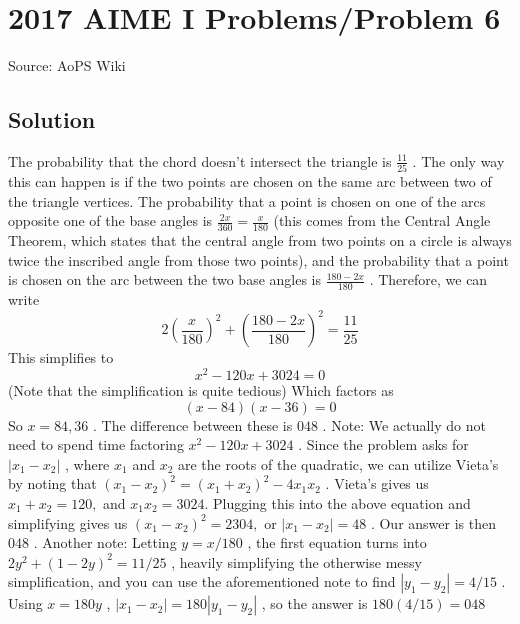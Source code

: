 \documentclass[12pt]{article}
\begin{document}
\section*{{2017 AIME I Problems/Problem 6}}
Source: AoPS Wiki

\subsection*{Solution}
The probability that the chord doesn't intersect the triangle is $\frac{11}{25}$ . The only way this can happen is if the two points are chosen on the same arc between two of the triangle vertices. The probability that a point is chosen on one of the arcs opposite one of the base angles is $\frac{2x}{360}=\frac{x}{180}$ (this comes from the Central Angle Theorem, which states that the central angle from two points on a circle is always twice the inscribed angle from those two points), and the probability that a point is chosen on the arc between the two base angles is $\frac{180-2x}{180}$ . Therefore, we can write \[2\left(\frac{x}{180}\right)^2+\left(\frac{180-2x}{180}\right)^2=\frac{11}{25}\] This simplifies to \[x^2-120x+3024=0\] (Note that the simplification is quite tedious) Which factors as \[(x-84)(x-36)=0\] So $x=84, 36$ . The difference between these is $\boxed{048}$ . Note: We actually do not need to spend time factoring $x^2 - 120x + 3024$ . Since the problem asks for $|x_1 - x_2|$ , where $x_1$ and $x_2$ are the roots of the quadratic, we can utilize Vieta's by noting that $(x_1 - x_2) ^ 2 = (x_1 + x_2) ^ 2 - 4x_1x_2$ . Vieta's gives us $x_1 + x_2 = 120,$ and $x_1x_2 = 3024.$ Plugging this into the above equation and simplifying gives us $(x_1 - x_2) ^ 2 = 2304,$ or $|x_1 - x_2| = 48$ . Our answer is then $\boxed{048}$ . Another note: Letting $y = x/180$ , the first equation turns into $2y^2 + (1-2y)^2 = 11/25$ , heavily simplifying the otherwise messy simplification, and you can use the aforementioned note to find $|y_1 - y_2| = 4/15$ . Using $x = 180y$ , $|x_1 - x_2| = 180|y_1 - y_2|$ , so the answer is $180(4/15) = \boxed{048}$
\end{document}
